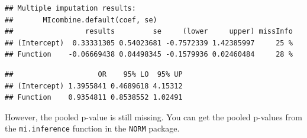 \documentclass[]{book}
\newenvironment{Shaded}{\begin{snugshade}}{\end{snugshade}}
\newcommand{\KeywordTok}[1]{\textcolor[rgb]{0.13,0.29,0.53}{\textbf{#1}}}
\newcommand{\DataTypeTok}[1]{\textcolor[rgb]{0.13,0.29,0.53}{#1}}
\newcommand{\DecValTok}[1]{\textcolor[rgb]{0.00,0.00,0.81}{#1}}
\newcommand{\StringTok}[1]{\textcolor[rgb]{0.31,0.60,0.02}{#1}}
\newcommand{\ControlFlowTok}[1]{\textcolor[rgb]{0.13,0.29,0.53}{\textbf{#1}}}
\newcommand{\OperatorTok}[1]{\textcolor[rgb]{0.81,0.36,0.00}{\textbf{#1}}}
\newcommand{\NormalTok}[1]{#1}
\begin{document}
\begin{verbatim}
## Multiple imputation results:
##       MIcombine.default(coef, se)
##                 results         se     (lower     upper) missInfo
## (Intercept)  0.33331305 0.54023681 -0.7572339 1.42385997     25 %
## Function    -0.06669438 0.04498345 -0.1579936 0.02460484     28 %
\end{verbatim}

\begin{Shaded}
\end{Shaded}

\begin{verbatim}
##                    OR    95% LO  95% UP
## (Intercept) 1.3955841 0.4689618 4.15312
## Function    0.9354811 0.8538552 1.02491
\end{verbatim}

However, the pooled p-value is still missing. You can get the pooled
p-values from the \texttt{mi.inference} function in the \texttt{NORM}
package.

\begin{Shaded}
\end{Shaded}
\end{document}

